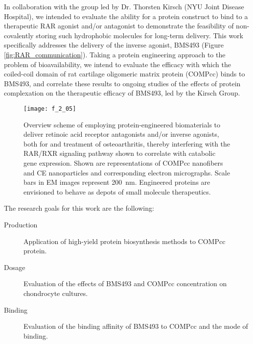 \begin{refsection}
In collaboration with the group led by Dr. Thorsten Kirsch (NYU Joint Disease
Hospital), we intended to evaluate the ability for a protein construct to bind
to a therapeutic RAR agonist and/or antagonist to demonstrate the feasibility of
non-covalently storing such hydrophobic molecules for long-term delivery. This
work specifically addresses the delivery of the inverse agonist, BMS493 (Figure
\ref{fig:RAR_communication}). Taking a protein engineering approach to the
problem of bioavailability, we intend to evaluate the efficacy with which the
coiled-coil domain of rat cartilage oligomeric matrix protein (COMPcc) binds to
BMS493, and correlate these results to ongoing  studies of the
effects of protein complexation on the therapeutic efficacy of BMS493, led by
the Kirsch Group. 
\begin{figure}[h!] \centering \texttt{[image: f\_2\_05]}
    \caption{Overview scheme of employing protein-engineered biomaterials to
        deliver retinoic acid receptor antagonists and/or inverse agonists, both
        for  and  treatment of osteoarthritis,
        thereby interfering with the RAR/RXR signaling pathway shown to
        correlate with catabolic gene expression.  Shown are representations of
        COMPcc nanofibers and CE nanoparticles and corresponding electron
        micrographs. Scale bars in EM images represent \SI{200}{\nm}. Engineered
        proteins are envisioned to behave as depots of small molecule
    therapeutics.}\label{fig:research_intention} \end{figure}
The research goals for this work are the following:
\begin{description}
    \item[Production] Application of high-yield protein biosynthesis methods to
        COMPcc protein.
    \item[Dosage] Evaluation of the effects of BMS493 and COMPcc concentration on
         chondrocyte cultures.
    \item[Binding] Evaluation of the binding affinity of BMS493 to COMPcc and
        the mode of binding.
\end{description}


\end{refsection}
